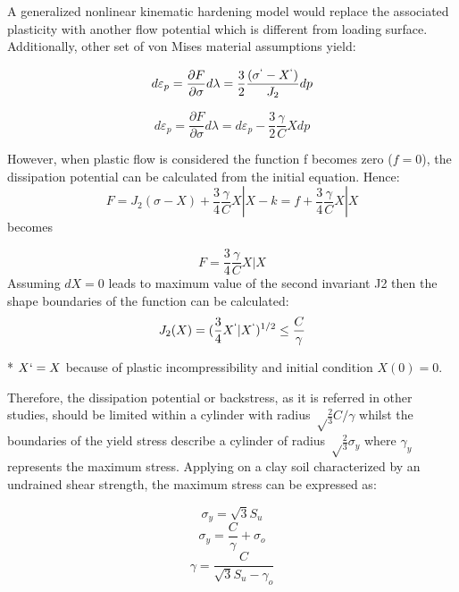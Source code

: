 \documentclass[10pt,a4paper]{report}
\begin{document}
A generalized nonlinear kinematic hardening model would replace the associated plasticity with another flow potential which is different from loading surface. Additionally, other set of von Mises material assumptions yield:

\begin{equation}
	d\varepsilon_p=\frac{\partial F}{\partial \sigma} d\lambda = \frac{3}{2} \frac{(\sigma^` - X^`)}{J_2} dp
\end{equation}

\begin{equation}
d\varepsilon_p=\frac{\partial F}{\partial \sigma} d\lambda = d\varepsilon_p - \frac{3}{2} \frac{\gamma}{C}X dp
\end{equation}

However, when plastic flow is considered the function f becomes zero ($f=0$), the dissipation potential can be calculated from the initial equation. Hence:
\begin{equation}
	F=J_2(\sigma - X)+ \frac{3}{4} \frac{\gamma}{C} X|X -k = f+\frac{3}{4} \frac{\gamma}{C}X|X
\end{equation}
becomes

\begin{equation}
	F=\frac{3}{4} \frac{\gamma}{C}X|X
\end{equation}
Assuming $dX=0$ leads to maximum value of the second invariant J2 then the shape boundaries of the function can be calculated:
\begin{equation}
	J_2(X)=(\frac{3}{4}X^`|X^`)^{1/2}\leq\frac{C}{\gamma}
\end{equation}

* $X`=X$ because of plastic incompressibility and initial condition $X(0)=0$.

Therefore, the dissipation potential or backstress, as it is referred in other studies, should be limited within a cylinder with radius $\sqrt\frac{2}{3} C/\gamma$ whilst the boundaries of the yield stress describe a cylinder of radius  $\sqrt\frac{2}{3}\sigma_y$ where $\gamma_y$ represents the maximum stress. Applying on a clay soil characterized by an undrained shear strength, the maximum stress can be expressed as:

\begin{equation}
\sigma_y=\sqrt{3}S_u
\end{equation}
\begin{equation}
\sigma_y = \frac{C}{\gamma}+\sigma_o
\end{equation}
\begin{equation}
\gamma = \frac{C}{\sqrt{3}S_u - \gamma_o}
\end{equation}
\end{document}
